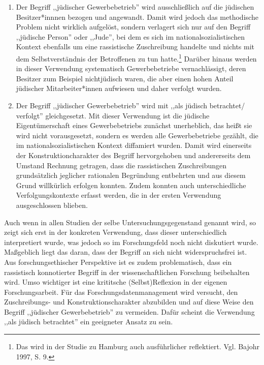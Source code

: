 \begin{enumerate}
    \item Der Begriff ,,jüdischer Gewerbebetrieb'' wird ausschließlich auf die jüdischen Besitzer*innnen bezogen und angewandt. Damit wird jedoch das methodische Problem nicht wirklich aufgelöst, sondern verlagert sich nur auf den Begriff ,,jüdische Person'' oder ,,Jude'', bei dem es sich im nationalsozialistischen Kontext ebenfalls um eine rassistische Zuschreibung handelte und nichts mit dem Selbstverständnis der Betroffenen zu tun hatte.\footnote{Das wird in der Studie zu Hamburg auch ausführlicher reflektiert. Vgl. Bajohr 1997, S. 9.} Darüber hinaus werden in dieser Verwendung systematisch Gewerbebetriebe vernachlässigt, deren Besitzer zum Beispiel nichtjüdisch waren, die aber einen hohen Anteil jüdischer Mitarbeiter*innen aufwiesen und daher verfolgt wurden. 
    \item Der Begriff ,,jüdischer Gewerbebetrieb'' wird mit ,,als jüdisch betrachtet/ verfolgt'' gleichgesetzt. Mit dieser Verwendung ist die jüdische Eigentümerschaft eines Gewerbebetriebs zunächst unerheblich, das heißt sie wird nicht vorausgesetzt, sondern es werden alle Gewerbebetriebe gezählt, die im nationalsozialistischen Kontext diffamiert wurden. Damit wird einerseits der Konstruktioncharakter des Begriff hervorgehoben und andererseits dem Umstand Rechnung getragen, dass die rassistischen Zuschreibungen grundsätzlich jeglicher rationalen Begründung entbehrten und aus diesem Grund willkürlich erfolgen konnten. Zudem konnten auch unterschiedliche Verfolgungskontexte erfasst werden, die in der ersten Verwendung ausgeschlossen blieben.
\end{enumerate}

Auch wenn in allen Studien der selbe Untersuchungsgegenstand genannt wird, so zeigt sich erst in der konkreten Verwendung, dass dieser unterschiedlich interpretiert wurde, was jedoch so im Forschungsfeld noch nicht diskutiert wurde. Maßgeblich liegt das daran, dass der Begriff an sich nicht widerspruchsfrei ist. Aus forschungsethischer Perspektive ist es zudem problematisch, dass ein rassistisch konnotierter Begriff in der wissenschaftlichen Forschung beibehalten wird. Umso wichtiger ist eine krititsche (Selbst)Reflexion in der eigenen Forschungsarbeit. Für das Forschungsdatenmanagement wird versucht, den Zuschreibungs- und Konstruktionscharakter abzubilden und auf diese Weise den Begriff ,,jüdischer Gewerbebetrieb'' zu vermeiden. Dafür scheint die Verwendung ,,als jüdisch betrachtet'' ein geeigneter Ansatz zu sein.

